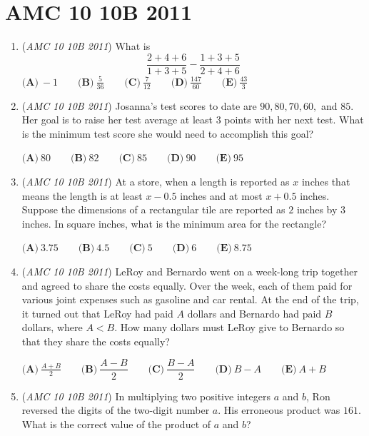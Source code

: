 \section{AMC 10 10B 2011}
        \begin{enumerate}
        	\item (\textit{AMC 10 10B 2011}) What is 
 \[\dfrac{2+4+6}{1+3+5} - \dfrac{1+3+5}{2+4+6}\]
$\textbf{(A)}\ -1\qquad\textbf{(B)}\ \frac{5}{36}\qquad\textbf{(C)}\ \frac{7}{12}\qquad\textbf{(D)}\ \frac{147}{60}\qquad\textbf{(E)}\ \frac{43}{3}$


	\item (\textit{AMC 10 10B 2011}) Josanna's test scores to date are $90, 80, 70, 60,$ and $85$. Her goal is to raise her test average at least $3$ points with her next test. What is the minimum test score she would need to accomplish this goal?


 $\textbf{(A)}\ 80 \qquad\textbf{(B)}\ 82 \qquad\textbf{(C)}\ 85 \qquad\textbf{(D)}\ 90 \qquad\textbf{(E)}\ 95$


	\item (\textit{AMC 10 10B 2011}) At a store, when a length is reported as $x$ inches that means the length is at least $x - 0.5$ inches and at most $x + 0.5$ inches. Suppose the dimensions of a rectangular tile are reported as $2$ inches by $3$ inches. In square inches, what is the minimum area for the rectangle?


 $\textbf{(A)}\ 3.75 \qquad\textbf{(B)}\ 4.5 \qquad\textbf{(C)}\ 5 \qquad\textbf{(D)}\ 6 \qquad\textbf{(E)}\ 8.75$


	\item (\textit{AMC 10 10B 2011}) LeRoy and Bernardo went on a week-long trip together and agreed to share the costs equally. Over the week, each of them paid for various joint expenses such as gasoline and car rental. At the end of the trip, it turned out that LeRoy had paid $A$ dollars and Bernardo had paid $B$ dollars, where $A < B$. How many dollars must LeRoy give to Bernardo so that they share the costs equally?


 $\textbf{(A)}\ \frac{A + B}{2} \qquad\textbf{(B)}\ \dfrac{A - B}{2}\qquad\textbf{(C)}\ \dfrac{B - A}{2}\qquad\textbf{(D)}\ B - A \qquad\textbf{(E)}\ A + B$


	\item (\textit{AMC 10 10B 2011}) In multiplying two positive integers $a$ and $b$, Ron reversed the digits of the two-digit number $a$. His erroneous product was $161$. What is the correct value of the product of $a$ and $b$?



\end{enumerate}
